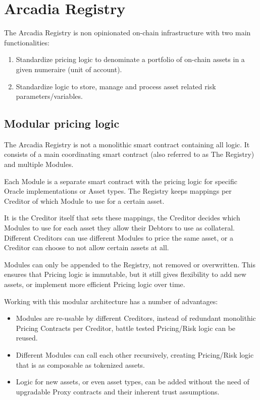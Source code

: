 \documentclass[sigconf,nonacm]{acmart}
\begin{document}
\section{Arcadia Registry}
\label{sec:arcadia-registry}

The Arcadia Registry is non opinionated on-chain infrastructure with two main functionalities:
\begin{enumerate}
    \item Standardize pricing logic to denominate a portfolio of on-chain assets in a given numeraire (unit of account).
    \item Standardize logic to store, manage and process asset related risk parameters/variables.
\end{enumerate}

\subsection{Modular pricing logic}
\label{subsec:modular-pricing-logic}
The Arcadia Registry is not a monolithic smart contract containing all logic.
It consists of a main coordinating smart contract (also referred to as The Registry) and multiple Modules.

Each Module is a separate smart contract with the pricing logic for specific Oracle implementations or Asset types.
The Registry keeps mappings per Creditor of which Module to use for a certain asset.

It is the Creditor itself that sets these mappings, the Creditor decides which Modules to use for each asset they allow their Debtors to use as collateral.
Different Creditors can use different Modules to price the same asset, or a Creditor can choose to not allow certain assets at all.

Modules can only be appended to the Registry, not removed or overwritten.
This ensures that Pricing logic is immutable, but it still gives flexibility to add new assets, or implement more efficient Pricing logic over time.

Working with this modular architecture has a number of advantages:
\begin{itemize}
    \item Modules are re-usable by different Creditors, instead of redundant monolithic Pricing Contracts per Creditor, battle tested Pricing/Risk logic can be reused.
    \item Different Modules can call each other recursively, creating Pricing/Risk logic that is as composable as tokenized assets.
    \item Logic for new assets, or even asset types, can be added without the need of upgradable Proxy contracts and their inherent trust assumptions.
\end{itemize}
\end{document}
